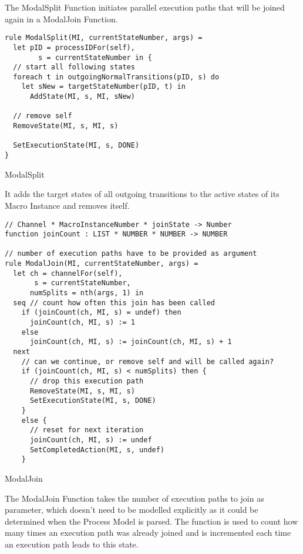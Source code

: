The ModalSplit Function initiates parallel execution paths that will be joined
again in a ModalJoin Function.


\begin{listing}[H]
\begin{verbatim}
rule ModalSplit(MI, currentStateNumber, args) =
  let pID = processIDFor(self),
        s = currentStateNumber in {
  // start all following states
  foreach t in outgoingNormalTransitions(pID, s) do
    let sNew = targetStateNumber(pID, t) in
      AddState(MI, s, MI, sNew)

  // remove self
  RemoveState(MI, s, MI, s)

  SetExecutionState(MI, s, DONE)
}
\end{verbatim}
\caption{ModalSplit}
\label{lst:shortasm:ModalSplit}
\end{listing}


It adds the target states of all outgoing transitions to the active states of its
Macro Instance and removes itself.



\begin{listing}[H]
\begin{verbatim}
// Channel * MacroInstanceNumber * joinState -> Number
function joinCount : LIST * NUMBER * NUMBER -> NUMBER

// number of execution paths have to be provided as argument
rule ModalJoin(MI, currentStateNumber, args) =
  let ch = channelFor(self),
       s = currentStateNumber,
      numSplits = nth(args, 1) in
  seq // count how often this join has been called
    if (joinCount(ch, MI, s) = undef) then
      joinCount(ch, MI, s) := 1
    else
      joinCount(ch, MI, s) := joinCount(ch, MI, s) + 1
  next
    // can we continue, or remove self and will be called again?
    if (joinCount(ch, MI, s) < numSplits) then {
      // drop this execution path
      RemoveState(MI, s, MI, s)
      SetExecutionState(MI, s, DONE)
    }
    else {
      // reset for next iteration
      joinCount(ch, MI, s) := undef
      SetCompletedAction(MI, s, undef)
    }
\end{verbatim}
\caption{ModalJoin}
\label{lst:shortasm:ModalJoin}
\end{listing}


The ModalJoin Function takes the number of execution paths to join as parameter,
which doesn't need to be modelled explicitly as it could be determined when the Process Model is parsed.
The  function is used to count how
many times an execution path was already joined and is incremented each time an
execution path leads to this state.

